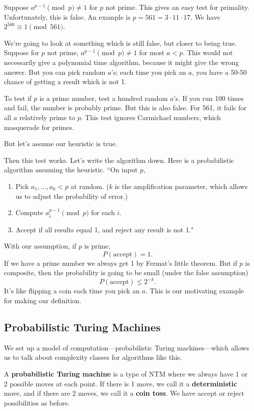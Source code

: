 Suppose $a^{p-1}\pmod p\ne 1$ for $p$ not prime. This gives an easy test for primality. Unfortunately, this is false. An example is $p=561=3\cdot11\cdot 17$. We have $2^{560}\equiv 1\pmod{561}$.

We're going to look at something which is still false, but closer to being true. Suppose for $p$ not prime, $a^{p-1}\pmod p\ne 1$ for most $a<p$. This would not necessarily give a polynomial time algorithm, because it might give the wrong answer. But you can pick random $a$'s; each time you pick an $a$, you have a 50-50 chance of getting a result which is not 1.

To test if $p$ is a prime number, test a hundred random $a$'s. If you run 100 times and fail, the number is probably prime. But this is also false.
For 561, it fails for all $a$ relatively prime to $p$.
This test ignores Carmichael numbers, which masquerade for primes.

But let's assume our heuristic is true.

Then this test works. Let's write the algorithm down. Here is a probabilistic algorithm assuming the heuristic. ``On input $p$,
\begin{enumerate}
\item
Pick $a_1,\ldots, a_k<p$ at random. ($k$ is the amplification parameter, which allows us to adjust the probability of error.)
\item
Compute $a_i^{p-1}\pmod p$ for each $i$.
\item
Accept if all results equal 1, and reject any result is not 1."
\end{enumerate}

With our assumption, if $p$ is prime, 
\[
P(\text{accept})=1.
\]
If we have a prime number we always get 1 by Fermat's little theorem.
But if $p$ is composite, then the probability is going to be small (under the false assumption)
\[
P(\text{accept})\le 2^{-k}.
\]
It's like flipping a coin each time you pick an $a$. This is our motivating example for making our definition.

\subsection{Probabilistic Turing Machines}
We set up a model of computation---probabilistic Turing machines---which allows us to talk about complexity classes for algorithms like this.
\begin{df}
A \textbf{probabilistic Turing machine} is a type of NTM where we always have 1 or 2 possible moves at each point. %
If there is 1 move, we call it a \textbf{deterministic} move, and if there are 2 moves, we call it a \textbf{coin toss}. We have accept or reject possibilities as before.
\end{df}

